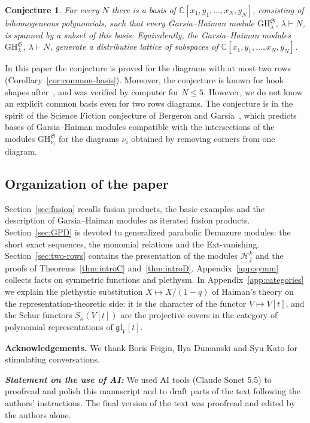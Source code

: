 \documentclass[11pt]{amsart}
\numberwithin{equation}{section}
\newtheorem{conjecture}[equation]{Conjecture}
\theoremstyle{definition}
\newcommand{\gl}{\mathfrak{gl}}
\newcommand{\GH}{\mathrm{GH}}         %
\begin{document}
	\begin{conjecture}\label{conj:common-basis}
		For every $N$ there is a basis of $\mathbb C[x_1,y_1,\dots,x_N,y_N]$, consisting of bihomogeneous polynomials, such that every Garsia--Haiman module $\GH^{\mathfrak S}_\lambda$, $\lambda\vdash N$, is spanned by a subset of this basis. Equivalently, the Garsia--Haiman modules $\GH^{\mathfrak S}_\lambda$, $\lambda\vdash N$, generate a distributive lattice of subspaces of $\mathbb C[x_1,y_1,\dots,x_N,y_N]$.
	\end{conjecture}
	In this paper the conjecture is proved for the diagrams with at most two rows (Corollary~\ref{cor:common-basis}). Moreover, the conjecture is known for hook shapes after~\cite{Adin-GS-hooks},\cite{Arm} and was verified by computer for $N\le5$.
	However, we do not know an explicit common basis even for two rows diagrams.
	The conjecture is in the spirit of the Science Fiction conjecture of Bergeron and Garsia~\cite{BG}, which predicts bases of Garsia--Haiman modules compatible with the intersections of the modules $\GH^{\mathfrak S}_{\nu_i}$ for the diagrams $\nu_i$ obtained by removing corners from one diagram.
	
	\subsection{Organization of the paper}
	
	Section~\ref{sec:fusion} recalls fusion products, the basic examples and the description of Garsia--Haiman modules as iterated fusion products. Section~\ref{sec:GPD} is devoted to generalized parabolic Demazure modules: the short exact sequences, the monomial relations and the Ext-vanishing. Section~\ref{sec:two-rows} contains the presentation of the modules $\mathcal H_j^k$ and the proofs of Theorems~\ref{thm:introC} and~\ref{thm:introD}. Appendix~\ref{app:symm} collects facts on symmetric functions and plethysm. In Appendix~\ref{app:categories} we explain the plethystic substitution $X\mapsto X/(1-q)$ of Haiman's theory on the representation-theoretic side: it is the character of the functor $V\mapsto V[t]$, and the Schur functors $S_\kappa(V[t])$ are the projective covers in the category of polynomial representations of $\gl_V[t]$.
	
	\medskip\noindent\textbf{Acknowledgements.}
	We thank Boris Feigin, Ilya Dumanski and Syu Kato for stimulating conversations.
	
	{\textbf{\it{Statement on the use of AI:}}}
	We used AI tools (Claude Sonet 5.5) to proofread and polish this manuscript and to draft parts of the text following the authors' instructions. The final version of the text was proofread and edited by the authors alone.
	
\end{document}
